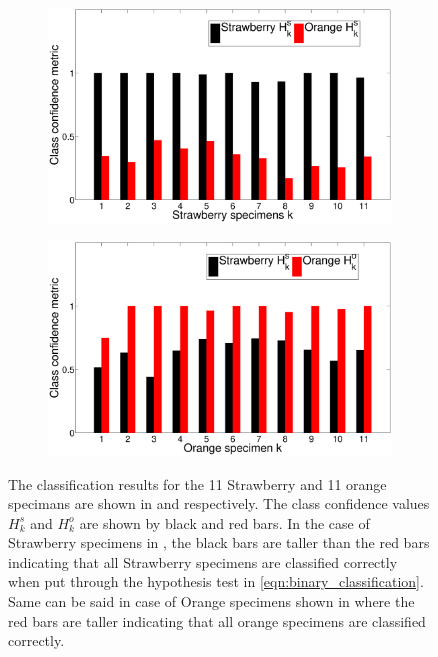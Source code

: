 \documentclass {udthesis}
\begin{document}
%
\begin{figure}
  \centering
  \begin{subfigure}[]{0.7\textwidth}
      \includegraphics[width=\textwidth]{classification_metric_strawberry}
      \caption{}
      \label{fig:results_strawberry}
  \end{subfigure}
  \vskip -2pt
  \begin{subfigure}[]{0.7\textwidth}
      \includegraphics[width=\textwidth]{classification_metric_orange}
      \caption{}
      \label{fig:results_orange}
  \end{subfigure}
\caption[Classification results]{The classification results for the 11 Strawberry and 11 orange specimans are shown in  and  respectively. The class confidence values $H^s_k$ and $H^o_k$ are shown by black and red bars. In the case of Strawberry specimens in , the black bars are taller than the red bars indicating that all Strawberry specimens are classified correctly when put through the hypothesis test in \ref{eqn:binary_classification}. Same can be said in case of Orange specimens shown in  where the red bars are taller indicating that all orange specimens are classified correctly.}
\label{fig:results}
\end{figure}	
%
\end{document}
